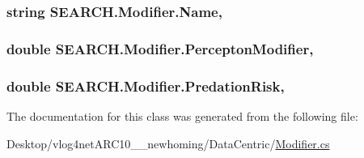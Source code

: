 \hypertarget{class_s_e_a_r_c_h_1_1_modifier_ab012caf0cb9046e861692569acf540fd}{
\subsubsection[{Name}]{\setlength{\rightskip}{0pt plus 5cm}string S\-E\-A\-R\-C\-H.\-Modifier.\-Name\hspace{0.3cm}{\ttfamily [get]}, {\ttfamily [set]}}}\label{class_s_e_a_r_c_h_1_1_modifier_ab012caf0cb9046e861692569acf540fd}
\hypertarget{class_s_e_a_r_c_h_1_1_modifier_afae7871e75792196f3129ecbd9dc41d2}{
\subsubsection[{Percepton\-Modifier}]{\setlength{\rightskip}{0pt plus 5cm}double S\-E\-A\-R\-C\-H.\-Modifier.\-Percepton\-Modifier\hspace{0.3cm}{\ttfamily [get]}, {\ttfamily [set]}}}\label{class_s_e_a_r_c_h_1_1_modifier_afae7871e75792196f3129ecbd9dc41d2}
\hypertarget{class_s_e_a_r_c_h_1_1_modifier_ae62b3e7d070587389037bfa82a06a57c}{
\subsubsection[{Predation\-Risk}]{\setlength{\rightskip}{0pt plus 5cm}double S\-E\-A\-R\-C\-H.\-Modifier.\-Predation\-Risk\hspace{0.3cm}{\ttfamily [get]}, {\ttfamily [set]}}}\label{class_s_e_a_r_c_h_1_1_modifier_ae62b3e7d070587389037bfa82a06a57c}


The documentation for this class was generated from the following file\-:\begin{DoxyCompactItemize}
\item 
Desktop/vlog4net\-A\-R\-C10\-\_\-\_\-newhoming/\-Data\-Centric/\hyperlink{_modifier_8cs}{Modifier.\-cs}\end{DoxyCompactItemize}
